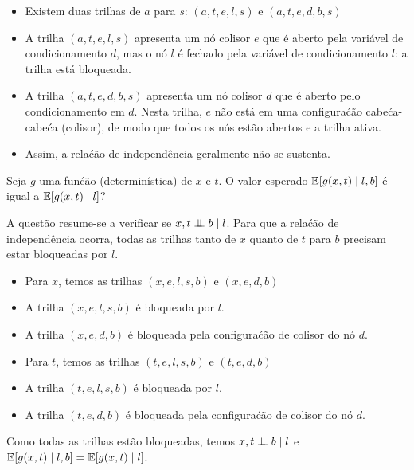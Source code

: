 \begin{exenumerate}
\begin{enumerate}
        \begin{solution}
            \begin{itemize}
                \item Existem duas trilhas de $a$ para $s$: $(a,t,e,l,s)$ e $(a,t,e,d,b,s)$
                \item A trilha $(a,t,e,l,s)$ apresenta um n\'o colisor $e$ que \'e aberto pela vari\'avel de condicionamento $d$, mas o n\'o $l$ \'e fechado pela vari\'avel de condicionamento $l$: a trilha est\'a bloqueada.
                \item A trilha $(a,t,e,d,b,s)$ apresenta um n\'o colisor $d$ que \'e aberto pelo condicionamento em $d$. Nesta trilha, $e$ n\~ao est\'a em uma configura\'c\~ao cabe\'ca-cabe\'ca (colisor), de modo que todos os n\'os est\~ao abertos e a trilha ativa.
                \item Assim, a rela\'c\~ao de independ\^encia geralmente n\~ao se sustenta.
            \end{itemize}
        \end{solution}           
        
    \end{enumerate}
    
    \item Seja $g$ uma fun\'c\~ao (determin\'istica) de $x$ e $t$. O valor esperado $\mathbb{E}[g(x,t) \mid l,b]$ \'e igual a $\mathbb{E}[g(x,t) \mid l]$?
    
    \begin{solution}
        A quest\~ao resume-se a verificar se $x,t \mathrel{\perp\mspace{-10mu}\perp} b \mid l$. Para que a rela\'c\~ao de independ\^encia ocorra, todas as trilhas tanto de $x$ quanto de $t$ para $b$ precisam estar bloqueadas por $l$.
        
        \begin{itemize}
            \item Para $x$, temos as trilhas $(x,e,l,s,b)$ e $(x,e,d,b)$
            \item A trilha $(x,e,l,s,b)$ \'e bloqueada por $l$.
            \item A trilha $(x,e,d,b)$ \'e bloqueada pela configura\'c\~ao de colisor do n\'o $d$.
            \item Para $t$, temos as trilhas $(t,e,l,s,b)$ e $(t,e,d,b)$
            \item A trilha $(t,e,l,s,b)$ \'e bloqueada por $l$.
            \item A trilha $(t,e,d,b)$ \'e bloqueada pela configura\'c\~ao de colisor do n\'o $d$.
        \end{itemize}
        Como todas as trilhas est\~ao bloqueadas, temos $x,t \mathrel{\perp\mspace{-10mu}\perp} b \mid l$ e $\mathbb{E}[ g(x,t) \mid l,b] = \mathbb{E}[ g(x,t) \mid l]$.
        
    \end{solution}
\end{exenumerate}


